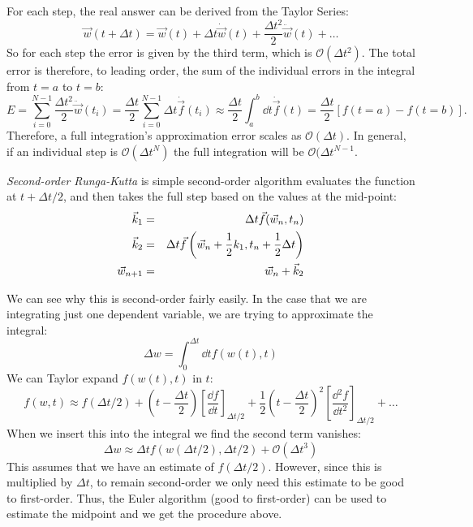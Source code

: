 \begin{answer}
  For each step, the real answer can be derived from the Taylor Series:
  \begin{equation}
    \vec{w}(t+\Delta t) = \vec{w}(t) + \Delta t {\dot{\vec{w}}}(t)
    + \frac{\Delta t^2}{2} \ddot{\vec{w}}(t) + \ldots
  \end{equation}
  So for each step the error is given by the third term, which is
  $\mathcal{O}(\Delta t^2)$. The total error is therefore, to leading
  order, the sum of the individual errors in the integral from $t=a$
  to $t=b$:
  \begin{equation}
    E = \sum_{i=0}^{N-1} \frac{\Delta t^2}{2} \ddot{\vec{w}}(t_i)
     = \frac{\Delta t}{2} \sum_{i=0}^{N-1} \Delta t \dot{\vec{f}}(t_i)
     \approx \frac{\Delta t}{2} \int_a^b \dd{t} \dot{\vec{f}}(t)
     = \frac{\Delta t}{2} \left[ f(t=a) - f(t=b)\right].
  \end{equation}
  Therefore, a full integration's approximation error scales as
  $\mathcal{O}(\Delta t)$. In general, if an individual step is
  $\mathcal{O}(\Delta t^N)$ the full integration will be
  $\mathcal{O}(\Delta t^{N-1}$.
\end{answer}

{\it Second-order Runga-Kutta} is simple second-order algorithm
evaluates the function at $t+\Delta t /2$, and then takes the full
step based on the values at the mid-point:
\begin{eqnarray}
\vec{k}_1 &=& \Delta t \vec{f}(\vec{w}_n, t_n) \cr
\vec{k}_2 &=& \Delta t \vec{f}\left(\vec{w}_n + \frac{1}{2} k_1,
t_n + \frac{1}{2}\Delta t\right) \cr
\vec{w}_{n+1} &=& \vec{w}_n + \vec{k}_2
\end{eqnarray}

We can see why this is second-order fairly easily. In the case that we
are integrating just one dependent variable, we are trying to
approximate the integral:
\begin{equation}
\Delta w = \int_0^{\Delta t} \dd{t} f(w(t), t)
\end{equation}
We can Taylor expand $f(w(t), t)$ in $t$:
\begin{equation}
  f(w, t) \approx f\left(\Delta t /2\right) +
  \left(t - \frac{\Delta t}{2}\right) \left[\frac{\dd{f}}{\dd{t}}\right]_{\Delta t /2} + 
  \frac{1}{2} \left(t - \frac{\Delta t}{2}\right)^2
  \left[\frac{\dd{^2f}}{\dd{t}^2}\right]_{\Delta t /2}   + \ldots
\end{equation}
When we insert this into the integral we find the second term vanishes:
\begin{equation}
\Delta w \approx \Delta t f(w(\Delta t /2), \Delta t /2) +
\mathcal{O}(\Delta t^3)
\end{equation}
This assumes that we have an estimate of $f(\Delta t /2)$.  However,
since this is multiplied by $\Delta t$, to remain second-order we only
need this estimate to be good to first-order. Thus, the Euler
algorithm (good to first-order) can be used to estimate the midpoint
and we get the procedure above.

